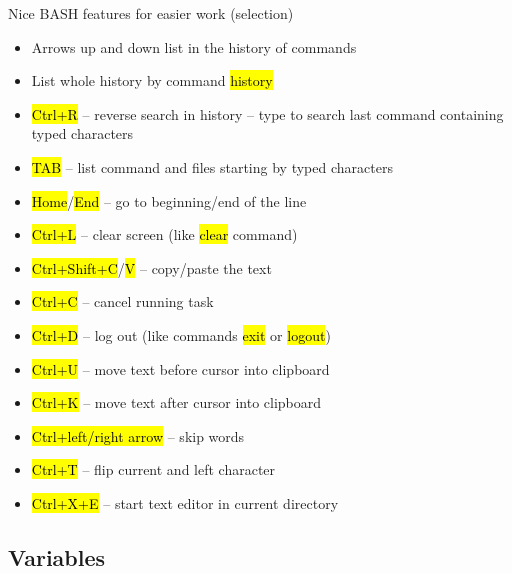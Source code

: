 \documentclass[compress, ucs, xelatex, 11pt, xcolor=svgnames,
  hyperref={
    bookmarks=true,
    unicode=true,
    colorlinks=true,
    pdftitle={Linux, command line and MetaCentrum},
    plainpages=false,
    pdfauthor={Vojtech Zeisek},
    pdfsubject={Course about use of Linux command line, writing shell scripts and using MetaCentrum of CESNET},
    pdfcreator={XeLaTeX},
    pdfkeywords={Linux, GNU, BASH, shell, command line, MetaCentrum},
    linkcolor=Red,
    anchorcolor=Blue,
    citecolor=Purple,
    filecolor=DodgerBlue,
    menucolor=DarkOrchid,
    urlcolor=DeepSkyBlue,
    pdftex},
  url={hyphens, lowtilde} %
  ]{beamer}
\renewcommand{\texttt}[1]{\hl{\ttfamily #1}}
\begin{document}
\begin{frame}{Nice BASH features for easier work (selection)}
\begin{itemize}
  \item Arrows up and down list in the history of commands
  \item List whole history by command \texttt{history}
  \item \texttt{Ctrl+R} -- reverse search in history -- type to search last command containing typed characters
  \item \texttt{TAB} -- list command and files starting by typed characters
  \item \texttt{Home}/\texttt{End} -- go to beginning/end of the line
  \item \texttt{Ctrl+L} -- clear screen (like \texttt{clear} command)
  \item \texttt{Ctrl+Shift+C}/\texttt{V} -- copy/paste the text
  \item \texttt{Ctrl+C} -- cancel running task
  \item \texttt{Ctrl+D} -- log out (like commands \texttt{exit} or \texttt{logout})
  \item \texttt{Ctrl+U} -- move text before cursor into clipboard
  \item \texttt{Ctrl+K} -- move text after cursor into clipboard
  \item \texttt{Ctrl+left/right arrow} -- skip words
  \item \texttt{Ctrl+T} -- flip current and left character
  \item \texttt{Ctrl+X+E} -- start text editor in current directory
\end{itemize}
\end{frame}

\subsection{Variables}
\end{document}
